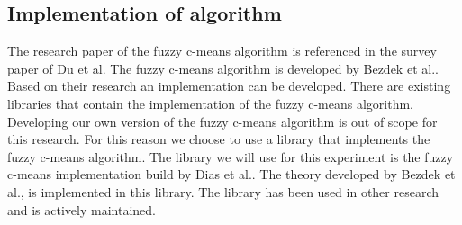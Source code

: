\documentclass[../../main]{subfiles}
\begin{document}
\subsection{Implementation of algorithm}
The research paper of the fuzzy c-means algorithm is referenced in the survey paper of Du et al\cite{Du2010Clustering:Approach}.
The fuzzy c-means algorithm is developed by Bezdek et al.\cite{Bezdek1984FCM:Algorithm}.
Based on their research an implementation can be developed.
There are existing libraries that contain the implementation of the fuzzy c-means algorithm.
Developing our own version of the fuzzy c-means algorithm is out of scope for this research.
For this reason we choose to use a library that implements the fuzzy c-means algorithm.
The library we will use for this experiment is the fuzzy c-means implementation build by Dias et al.\cite{dias2019fuzzy}.
The theory developed by Bezdek et al., is implemented in this library.
The library has been used in other research\cite{DeAlmeidaNeto2020, Kopf2019, Nwadiugwu2020} and is actively maintained.
\end{document}
